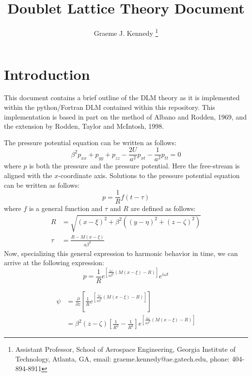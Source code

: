 \documentclass[12pt]{article}
\title{Doublet Lattice Theory Document}
\author{Graeme J. Kennedy
  \thanks{Assistant Professor, School of Aerospace Engineering,
    Georgia Institute of Technology, Atlanta, GA, email:
    graeme.kennedy@ae.gatech.edu, phone: 404-894-8911}}
\date{}
\newcommand{\p}{\partial}
\newcommand{\f}{\frac}
\begin{document}
\maketitle

\section{Introduction}

This document contains a brief outline of the DLM theory as it is
implemented within the python/Fortran DLM contained within this
repository. This implementation is based in part on the method of
Albano and Rodden, 1969, and the extension by Rodden, Taylor and
McIntosh, 1998.

The pressure potential equation can be written as follows:
%
\begin{equation*}
  \beta^{2} p_{xx} + p_{yy} + p_{zz} - \f{2U}{a^2} p_{xt} - \f{1}{a^2} p_{tt} = 0
\end{equation*}
where $p$ is both the pressure and the pressure potential. Here the
free-stream is aligned with the $x$-coordinate axis. Solutions to the
pressure potential equation can be written as follows:
%
\begin{equation*}
  p = \f{1}{R} f(t - \tau)
\end{equation*}
where $f$ is a general function and $\tau$ and $R$ are defined as
follows:
%
\begin{equation*}
  \begin{aligned}
    R & = \sqrt{(x - \xi)^2 + \beta^2((y - \eta)^2 + (z - \zeta)^2)} \\
    \tau & = \f{R - M(x - \xi)}{a\beta^2}
  \end{aligned}
\end{equation*}
Now, specializing this general expression to harmonic behavior
in time, we can arrive at the following expression:
%
\begin{equation*}
  p = \f{1}{R} e^{\left[ \f{i\omega}{a\beta^2}(M(x - \xi) - R)\right]} e^{i\omega t}
\end{equation*}


\begin{equation*}
  \begin{aligned}
    \psi & = \f{\p}{\p z} \left[ \f{1}{R} e^{\left[ \f{i\omega}{a\beta^2}(M(x - \xi) - R)\right]} \right] \\
    & = \beta^2 (z - \zeta)\left[ \f{1}{R^2} - \f{1}{R^3}\right]e^{\left[ \f{i\omega}{a\beta^2}(M(x - \xi) - R)\right]}
  \end{aligned}
\end{equation*}
\end{document}
